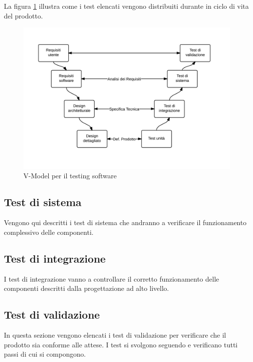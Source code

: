 	La figura \ref{fig:V-Model} illustra come i test elencati vengono distribuiti durante in ciclo di vita del prodotto.

	\begin{figure}[h]
	\centering \includegraphics[width=1\textwidth]{V-Model.png}
	\caption{V-Model per il testing software}
	\label{fig:V-Model}
	\end{figure}

	\pagebreak
	\subsection{Test di sistema}
	Vengono qui descritti i test di sistema che andranno a verificare il funzionamento complessivo delle componenti.
	
	
	\pagebreak
	\subsection{Test di integrazione}
	I test di integrazione vanno a controllare il corretto funzionamento delle componenti descritti dalla progettazione ad alto livello. 
	

	\pagebreak
	\subsection{Test di validazione}
	In questa sezione vengono elencati i test di validazione per verificare che il prodotto sia conforme alle attese. I test si svolgono seguendo e verificano tutti passi di cui si compongono. 
	
	
	
	
	

